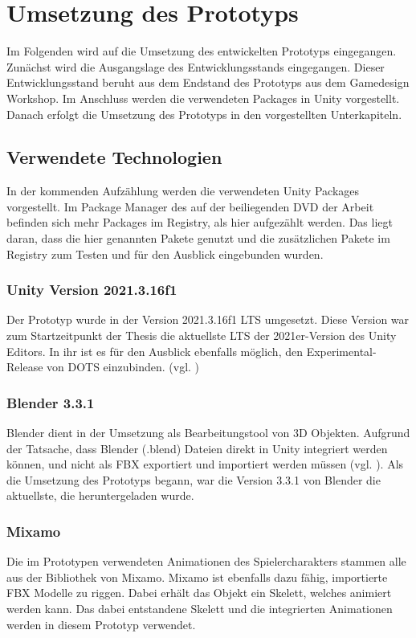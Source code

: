 \chapter{Umsetzung des Prototyps}\label{sec:dev}
Im Folgenden wird auf die Umsetzung des entwickelten Prototyps eingegangen. Zunächst wird die Ausgangslage des Entwicklungsstands eingegangen. Dieser Entwicklungsstand beruht aus dem Endstand des Prototyps aus dem Gamedesign Workshop. Im Anschluss werden die verwendeten Packages in Unity vorgestellt. Danach erfolgt die Umsetzung des Prototyps in den vorgestellten Unterkapiteln.

\section{Verwendete Technologien}
In der kommenden Aufzählung werden die verwendeten Unity Packages vorgestellt. Im Package Manager des auf der beiliegenden \ac{DVD} der Arbeit befinden sich mehr Packages im Registry, als hier aufgezählt werden. Das liegt daran, dass die hier genannten Pakete genutzt und die zusätzlichen Pakete im Registry zum Testen und für den Ausblick eingebunden wurden.

\subsection{Unity Version 2021.3.16f1}
Der Prototyp wurde in der Version 2021.3.16f1 \ac{LTS} umgesetzt. Diese Version war zum Startzeitpunkt der Thesis die aktuellste \ac{LTS} der 2021er-Version des Unity Editors. In ihr ist es für den Ausblick ebenfalls möglich, den Experimental-Release von \ac{DOTS} einzubinden. 
(vgl. \cite{noauthor_official_nodate})

\subsection{Blender 3.3.1}
Blender dient in der Umsetzung als Bearbeitungstool von \ac{3D} Objekten. Aufgrund der Tatsache, dass Blender (.blend) Dateien direkt in Unity integriert werden können, und nicht als \ac{FBX} exportiert und importiert werden müssen (vgl. \cite{technologies_unity_nodate}). Als die Umsetzung des Prototyps begann, war die Version 3.3.1 von Blender die aktuellste, die heruntergeladen wurde.

\subsection{Mixamo}
Die im Prototypen verwendeten Animationen des Spielercharakters stammen alle aus der Bibliothek von Mixamo. Mixamo ist ebenfalls dazu fähig, importierte \ac{FBX} Modelle zu riggen. Dabei erhält das Objekt ein Skelett, welches animiert werden kann. Das dabei entstandene Skelett und die integrierten Animationen werden in diesem Prototyp verwendet.

